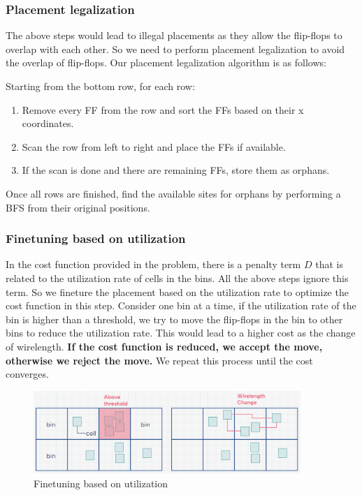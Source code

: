 \documentclass[12pt]{article}
\begin{document}
\subsubsection{Placement legalization}

The above steps would lead to illegal placements as they allow the flip-flops to overlap with each other. So we need to perform placement legalization to avoid the overlap of flip-flops. Our placement legalization algorithm is as follows:

Starting from the bottom row, for each row:

\begin{enumerate}
    \item Remove every FF from the row and sort the FFs based on their x coordinates.
    \item Scan the row from left to right and place the FFs if available.
    \item If the scan is done and there are remaining FFs, store them as orphans.
\end{enumerate}

Once all rows are finished, find the available sites for orphans by performing a BFS from their original positions.

\subsubsection{Finetuning based on utilization}

In the cost function provided in the problem, there is a penalty term $D$ that is related to the utilization rate of cells in the bins. All the above steps ignore this term. So we fineture the placement based on the utilization rate to optimize the cost function in this step. Consider one bin at a time, if the utilization rate of the bin is higher than a threshold, we try to move the flip-flops in the bin to other bins to reduce the utilization rate. This would lead to a higher cost as the change of wirelength. \textbf{If the cost function is reduced, we accept the move, otherwise we reject the move.} We repeat this process until the cost converges.

\begin{figure}[htbp]
    \centering
    \includegraphics[width=0.9\textwidth]{util.png}
    \caption{Finetuning based on utilization}
    \label{fig:finetuning}
\end{figure}
\end{document}

